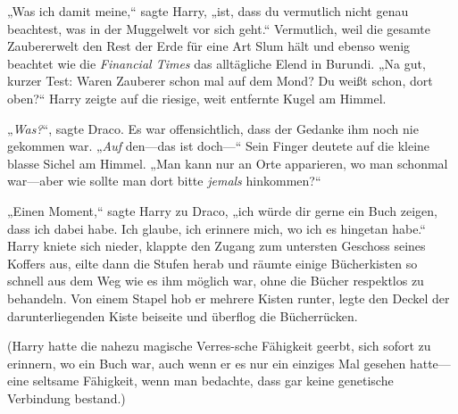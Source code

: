 „Was ich damit meine,“ sagte Harry, „ist, dass du vermutlich nicht genau beachtest, was in der Muggelwelt vor sich geht.“ Vermutlich, weil die gesamte Zaubererwelt den Rest der Erde für eine Art Slum hält und ebenso wenig beachtet wie die \emph{Financial Times} das alltägliche Elend in Burundi. „Na gut, kurzer Test: Waren Zauberer schon mal auf dem Mond? Du weißt schon, dort oben?“ Harry zeigte auf die riesige, weit entfernte Kugel am Himmel.

„\emph{Was?}“, sagte Draco. Es war offensichtlich, dass der Gedanke ihm noch nie gekommen war. „\emph{Auf} den—das ist doch—“ Sein Finger deutete auf die kleine blasse Sichel am Himmel. „Man kann nur an Orte apparieren, wo man schonmal war—aber wie sollte man dort bitte \emph{jemals} hinkommen?“

„Einen Moment,“ sagte Harry zu Draco, „ich würde dir gerne ein Buch zeigen, dass ich dabei habe. Ich glaube, ich erinnere mich, wo ich es hingetan habe.“ Harry kniete sich nieder, klappte den Zugang zum untersten Geschoss seines Koffers aus, eilte dann die Stufen herab und räumte einige Bücherkisten so schnell aus dem Weg wie es ihm möglich war, ohne die Bücher respektlos zu behandeln. Von einem Stapel hob er mehrere Kisten runter, legte den Deckel der darunterliegenden Kiste beiseite und überflog die Bücherrücken.

(Harry hatte die nahezu magische Verres-sche Fähigkeit geerbt, sich sofort zu erinnern, wo ein Buch war, auch wenn er es nur ein einziges Mal gesehen hatte—eine seltsame Fähigkeit, wenn man bedachte, dass gar keine genetische Verbindung bestand.)

